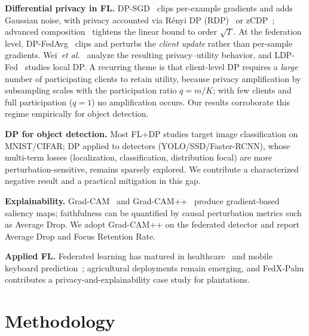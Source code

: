 \documentclass[conference]{IEEEtran}
\begin{document}
\textbf{Differential privacy in FL.} DP-SGD~\cite{abadi2016deep} clips
per-example gradients and adds Gaussian noise, with privacy accounted via
Rényi DP (RDP)~\cite{mironov2017renyi} or zCDP~\cite{bun2016concentrated};
advanced composition~\cite{dwork2010boosting} tightens the linear bound to
order $\sqrt{T}$. At the federation level, DP-FedAvg~\cite{mcmahan2018learning}
clips and perturbs the \emph{client update} rather than per-sample gradients.
Wei~\emph{et al.}~\cite{wei2020federated} analyze the resulting
privacy--utility behavior, and LDP-Fed~\cite{truex2020ldp} studies local DP.
A recurring theme is that client-level DP requires a \emph{large} number of
participating clients to retain utility, because privacy amplification by
subsampling scales with the participation ratio $q{=}m/K$; with few clients and
full participation ($q{=}1$) no amplification occurs. Our results corroborate
this regime empirically for object detection.

\textbf{DP for object detection.} Most FL+DP studies target image
classification on MNIST/CIFAR; DP applied to detectors (YOLO/SSD/Faster-RCNN),
whose multi-term losses (localization, classification, distribution focal) are
more perturbation-sensitive, remains sparsely explored. We contribute a
characterized negative result and a practical mitigation in this gap.

\textbf{Explainability.} Grad-CAM~\cite{selvaraju2017gradcam} and
Grad-CAM++~\cite{chattopadhay2018gradcampp} produce gradient-based saliency
maps; faithfulness can be quantified by causal perturbation metrics such as
Average Drop. We adopt Grad-CAM++ on the federated detector and report Average
Drop and Focus Retention Rate.

\textbf{Applied FL.} Federated learning has matured in
healthcare~\cite{rieke2020future} and mobile keyboard
prediction~\cite{hard2018federated}; agricultural deployments remain emerging,
and FedX-Palm contributes a privacy-and-explainability case study for
plantations.

\section{Methodology}
\label{sec:method}
\end{document}
